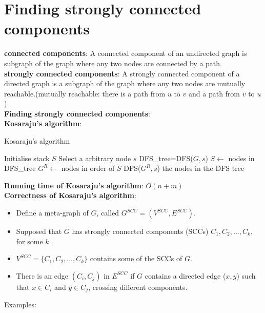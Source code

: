 \documentclass[onecolumn]{report}
\begin{document}
\section{Finding strongly connected components}
\textbf{connected components}: A connected component of an undirected graph is subgraph of the graph where any two nodes are connected by a path.\\
\textbf{strongly connected components}: A strongly connected component of a directed graph is a subgraph of the graph where any two nodes are mutually reachable.(mutually reachable: there is a path from $u$ to $v$ and a path from $v$ to $u$)\\
\textbf{Finding strongly connected components}:\\
\textbf{Kosaraju's algorithm}:\\
\begin{algorithm}[H]
\caption{Kosaraju's algorithm}
\begin{algorithmic}[1]
\State Initialise stack $S$
\State Select a arbitrary node $s$
\State DFS\_tree=DFS($G,s$)
\State $S \gets$ nodes in DFS\_tree
\State $G^R \gets$ nodes in order of $S$
\State DFS($G^R,s$)
\State \Return the nodes in the DFS tree
\EndProcedure
\end{algorithmic}
\end{algorithm}
\noindent
\textbf{Running time of Kosaraju's algorithm}: $O(n+m)$\\
\textbf{Correctness of Kosaraju's algorithm}:
\begin{itemize}
    \item Define a meta-graph of $G$, called $G^{SCC}=(V^{SCC},E^{SCC})$.
    \item Supposed that $G$ has strongly connected components (SCCs) $C_1,C_2,\dots,C_k$, for some $k$.
    \item $V^{SCC} = \{C_1,C_2,\dots,C_k\}$ contains some of the SCCs of $G$.
    \item There is an edge $(C_i,C_j)$ in $E^{SCC}$ if $G$ contains a directed edge ($x,y$) such that $x \in C_i$ and $y \in C_j$, crossing different components.
\end{itemize}
\noindent
Examples:
\begin{center}
\\
\end{center}
\end{document}
